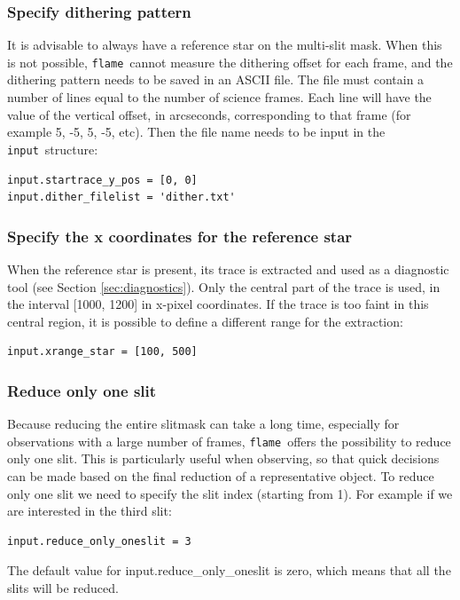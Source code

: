 \documentclass[a4paper, notitlepage]{article}
\newcommand{\flame}{\texttt{flame}}
\newcommand{\inp}{\texttt{input}}
\begin{document}
\subsubsection{Specify dithering pattern}

It is advisable to always have a reference star on the multi-slit mask. When this is not possible, \flame\ cannot measure the dithering offset for each frame, and the dithering pattern needs to be saved in an ASCII file. The file must contain a number of lines equal to the number of science frames. Each line will have the value of the vertical offset, in arcseconds, corresponding to that frame (for example 5, -5, 5, -5, etc). Then the file name needs to be input in the \inp\ structure:
\begin{lstlisting}
input.startrace_y_pos = [0, 0]
input.dither_filelist = 'dither.txt'
\end{lstlisting}


\subsubsection{Specify the x coordinates for the reference star}

When the reference star is present, its trace is extracted and used as a diagnostic tool (see Section \ref{sec:diagnostics}). Only the central part of the trace is used, in the interval [1000, 1200] in x-pixel coordinates. If the trace is too faint in this central region, it is possible to define a different range for the extraction:
\begin{lstlisting}
input.xrange_star = [100, 500]
\end{lstlisting}



\subsubsection{Reduce only one slit}

Because reducing the entire slitmask can take a long time, especially for observations with a large number of frames, \flame\ offers the possibility to reduce only one slit. This is particularly useful when observing, so that quick decisions can be made based on the final reduction of a representative object. To reduce only one slit we need to specify the slit index (starting from 1). For example if we are interested in the third slit:
\begin{lstlisting}
input.reduce_only_oneslit = 3
\end{lstlisting}
The default value for input.reduce\_only\_oneslit is zero, which means that all the slits will be reduced.
\end{document}
